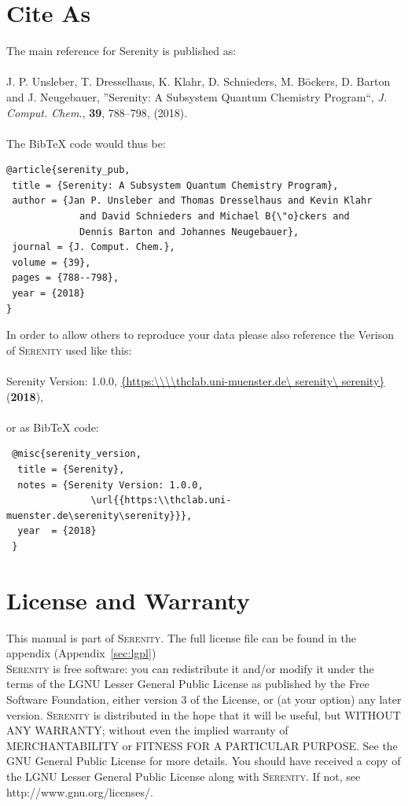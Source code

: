 \documentclass[bibliography=totocnumbered,a4paper,10pt]{scrartcl}
\newcommand{
\serenity}{\textsc{Serenity}\xspace}
\begin{document}

\clearpage
\section{Cite As}
The main reference for Serenity is published as:\\
\\
J. P. Unsleber, T. Dresselhaus, K. Klahr, D. Schnieders, M. B{\"o}ckers, D. Barton and J. Neugebauer, ''Serenity: A Subsystem Quantum Chemistry Program``,
 \textit{J. Comput. Chem.}, \textbf{39}, 788--798, (2018).\\
\\
The BibTeX code would thus be:
\begin{lstlisting}
@article{serenity_pub,
 title = {Serenity: A Subsystem Quantum Chemistry Program},
 author = {Jan P. Unsleber and Thomas Dresselhaus and Kevin Klahr
             and David Schnieders and Michael B{\"o}ckers and 
             Dennis Barton and Johannes Neugebauer},
 journal = {J. Comput. Chem.},
 volume = {39},
 pages = {788--798},
 year = {2018}
}
\end{lstlisting}
In order to allow others to reproduce your data please also
reference the Verison of \serenity used like this:\\
\\
Serenity Version: 1.0.0, \url{{https:\\\\thclab.uni-muenster.de\ serenity\ serenity}} (\textbf{2018}),\\
\\
or as BibTeX code:
\begin{lstlisting}
 @misc{serenity_version,
  title = {Serenity},
  notes = {Serenity Version: 1.0.0, 
               \url{{https:\\thclab.uni-muenster.de\serenity\serenity}}},
  year  = {2018}
 }
\end{lstlisting}

\section{License and Warranty}
This manual is part of \serenity. The full license file can be found in the appendix (Appendix~\ref{sec:lgpl})\\

\serenity is free software: you can redistribute it and/or modify it under 
the terms of the LGNU Lesser General Public License as published by the Free 
Software Foundation, either version 3 of the License, or (at your option) any later version.
\serenity is distributed in the hope that it will be useful, but 
WITHOUT ANY WARRANTY; without even the implied warranty of MERCHANTABILITY 
or FITNESS FOR A PARTICULAR PURPOSE. See the GNU General Public License for more details.
You should have received a copy of the LGNU Lesser General Public License along with 
\serenity. If not, see http://www.gnu.org/licenses/.
\end{document}
